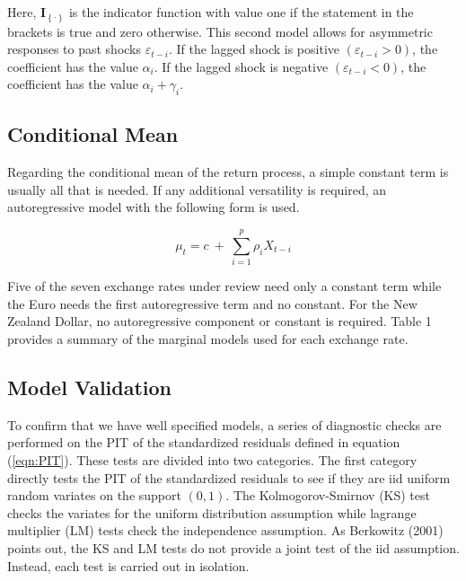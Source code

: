 \documentclass[12pt]{article}
\begin{document}
Here, $\mathbf{I}_{\left\{ \cdot \right\}}$ is the indicator function
with value one if the statement in the brackets is true and zero otherwise.
This second model allows for asymmetric responses to past shocks
$\varepsilon_{t-i}$. If the lagged shock is positive
$\left(\varepsilon_{t-i}>0\right)$, the coefficient has the value
$\alpha_{i}$. If the lagged shock is negative $\left(\varepsilon_{t-i} < 0 \right)$,
the coefficient has the value $\alpha_{i} + \gamma_{i}$.

\subsection{Conditional Mean}

Regarding the conditional mean of the return process, a simple constant term is usually all that is needed. If any additional versatility is required, an autoregressive model with the following form is used.

\begin{equation} \label{eqn:AR}
\mu_{t} = c ~+~ \sum_{i = 1}^{p} \rho_{i} X_{t - i}
\end{equation}

Five of the seven exchange rates under review need only a constant term
while the Euro needs the first autoregressive term and no constant. For
the New Zealand Dollar, no autoregressive component or constant is
required. Table 1 provides a summary of the marginal models used for each
exchange rate.

\subsection{Model Validation}

To confirm that we have well specified models, a series of diagnostic
checks are performed on the PIT of the standardized residuals defined in
equation (\ref{eqn:PIT}). These tests are divided into two categories.
The first category directly tests the PIT of the standardized residuals
to see if they are iid uniform random variates on the support
$\left(0,1\right)$. The Kolmogorov-Smirnov (KS) test checks the variates
for the uniform distribution assumption while lagrange multiplier (LM)
tests check the independence assumption. As Berkowitz (2001) points out,
the KS and LM tests do not provide a joint test of the iid assumption.
Instead, each test is carried out in isolation.
\end{document}

